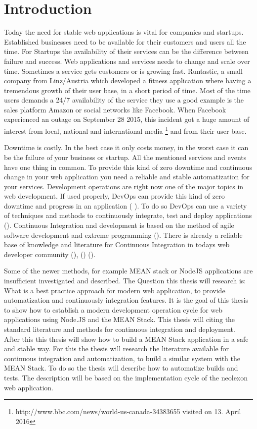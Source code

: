 \section{Introduction}
Today the need for stable web applications is vital for companies and startups. Established businesses need to be
available for their customers and users all the time. For Startups the availability of their services can be the difference
between failure and success. Web applications and services needs to change and scale over time. Sometimes a service gets customers or is
growing fast. Runtastic, a small company from Linz/Austria which developed a fitness application where having a tremendous growth of
their user base, in a short period of time. Most of the time users demands a 24/7 availability of the service they use a good example
is the sales platform Amazon or social networks like Facebook. When Facebook experienced an outage on September 28 2015, this incident
got a huge amount of interest from local, national and international media \footnote{http://www.bbc.com/news/world-us-canada-34383655 visited on 13. April 2016}
and from their user base.

Downtime is costly. In the best case it only costs money, in the worst case
it can be the failure of your business or startup. All the mentioned services and events have one thing in common. To provide this kind of zero
downtime and continuous change in your web application you need a reliable and stable automatization for your services. Development operations are
right now one of the major topics in web development. If used properly, DevOps can provide this kind of zero downtime and progress in an application
(\cite{humble2010continuous} \cite{duvall2007continuous}). To do so DevOps can use a variety of techniques and methods to continuously
integrate, test and deploy applications (\cite{meyer2014continuous}).
Continuous Integration and development is based on the method of agile software development and extreme programming
(\cite{lindstrom2004extreme}). There is already a reliable base of knowledge and literature for Continuous Integration in todays web developer community
(\cite{schaefer2013continuous}), (\cite{fowler2006continuous}) (\cite{fowler2012continuous}).

Some of the newer methods, for example MEAN stack or NodeJS applications are insufficient investigated and described.
The Question this thesis will research is: What is a best practice approach for modern web application,
to provide automatization and continuously integration features. It is the goal of this thesis to show how to establish a modern development operation
cycle for web applications using Node.JS and the MEAN Stack.
This thesis will citing the standard literature and methods for continuous integration and deployment. After this this thesis will
show how to build a MEAN Stack application in a safe and stable way.
For this the thesis will research the literature available for continuous integration and automatization, to build a similar system with the MEAN Stack.
To do so the thesis will describe how to automatize builds and tests. The description will be based on the implementation cycle of the neolexon web application.

